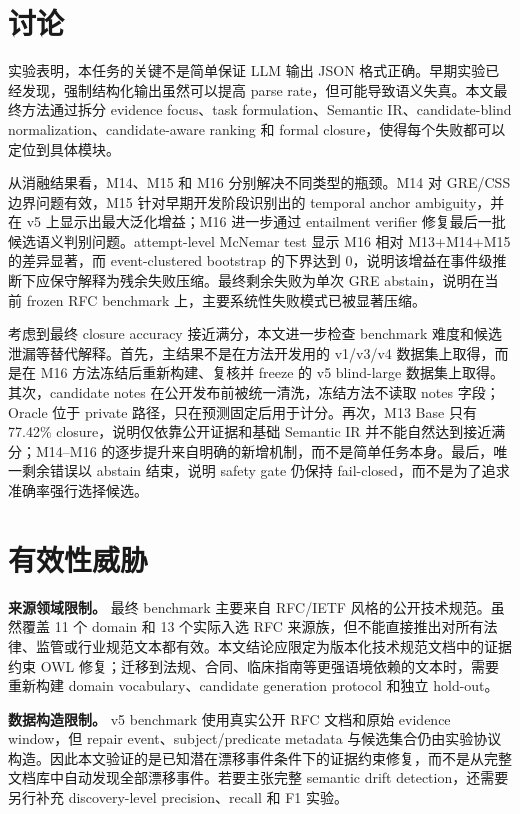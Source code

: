 \documentclass[11pt]{article}
\begin{document}
\section{讨论}

实验表明，本任务的关键不是简单保证 LLM 输出 JSON 格式正确。早期实验已经发现，强制结构化输出虽然可以提高 parse rate，但可能导致语义失真。本文最终方法通过拆分 evidence focus、task formulation、Semantic IR、candidate-blind normalization、candidate-aware ranking 和 formal closure，使得每个失败都可以定位到具体模块。

从消融结果看，M14、M15 和 M16 分别解决不同类型的瓶颈。M14 对 GRE/CSS 边界问题有效，M15 针对早期开发阶段识别出的 temporal anchor ambiguity，并在 v5 上显示出最大泛化增益；M16 进一步通过 entailment verifier 修复最后一批候选语义判别问题。attempt-level McNemar test 显示 M16 相对 M13+M14+M15 的差异显著，而 event-clustered bootstrap 的下界达到 0，说明该增益在事件级推断下应保守解释为残余失败压缩。最终剩余失败为单次 GRE abstain，说明在当前 frozen RFC benchmark 上，主要系统性失败模式已被显著压缩。

考虑到最终 closure accuracy 接近满分，本文进一步检查 benchmark 难度和候选泄漏等替代解释。首先，主结果不是在方法开发用的 v1/v3/v4 数据集上取得，而是在 M16 方法冻结后重新构建、复核并 freeze 的 v5 blind-large 数据集上取得。其次，candidate notes 在公开发布前被统一清洗，冻结方法不读取 notes 字段；Oracle 位于 private 路径，只在预测固定后用于计分。再次，M13 Base 只有 77.42\% closure，说明仅依靠公开证据和基础 Semantic IR 并不能自然达到接近满分；M14--M16 的逐步提升来自明确的新增机制，而不是简单任务本身。最后，唯一剩余错误以 abstain 结束，说明 safety gate 仍保持 fail-closed，而不是为了追求准确率强行选择候选。

\section{有效性威胁}

\textbf{来源领域限制。} 最终 benchmark 主要来自 RFC/IETF 风格的公开技术规范。虽然覆盖 11 个 domain 和 13 个实际入选 RFC 来源族，但不能直接推出对所有法律、监管或行业规范文本都有效。本文结论应限定为版本化技术规范文档中的证据约束 OWL 修复；迁移到法规、合同、临床指南等更强语境依赖的文本时，需要重新构建 domain vocabulary、candidate generation protocol 和独立 hold-out。

\textbf{数据构造限制。} v5 benchmark 使用真实公开 RFC 文档和原始 evidence window，但 repair event、subject/predicate metadata 与候选集合仍由实验协议构造。因此本文验证的是已知潜在漂移事件条件下的证据约束修复，而不是从完整文档库中自动发现全部漂移事件。若要主张完整 semantic drift detection，还需要另行补充 discovery-level precision、recall 和 F1 实验。
\end{document}
